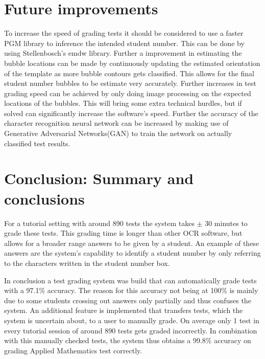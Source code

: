 \section{Future improvements}

To increase the speed of grading tests it should be considered to use a faster PGM library to inference the intended student number. This can be done by using Stellenbosch's emdw library. Further a improvement in estimating the bubble locations can be made by continuously updating the estimated orientation of the template as more bubble contours gets classified. This allows for the final student number bubbles to be estimate very accurately. Further increases in test grading speed can be achieved by only doing image processing on the expected locations of the bubbles. This will bring some extra technical hurdles, but if solved can significantly increase the software's speed. Further the accuracy of the character recognition neural network can be increased by making use of Generative Adversarial Networks(GAN) to train the network on actually classified test results.

\section{Conclusion: Summary and conclusions}

For a tutorial setting with around 890 tests the system takes $\pm$ 30 minutes to grade these tests. This grading time is longer than other OCR software, but allows for a broader range answers to be given by a student. An example of these answers are the system's capability to identify a student number by only referring to the characters written in the student number box.

In conclusion a test grading system was build that can automatically grade tests with a 97.1\% accuracy. The reason for this accuracy not being at 100\% is mainly due to some students crossing out answers only partially and thus confuses the system. An additional feature is implemented that transfers tests, which the system is uncertain about, to a user to manually grade. On average only 1 test in every tutorial session of around 890 tests gets graded incorrectly. In combination with this manually checked tests, the system thus obtains a 99.8\% accuracy on grading Applied Mathematics test correctly. 